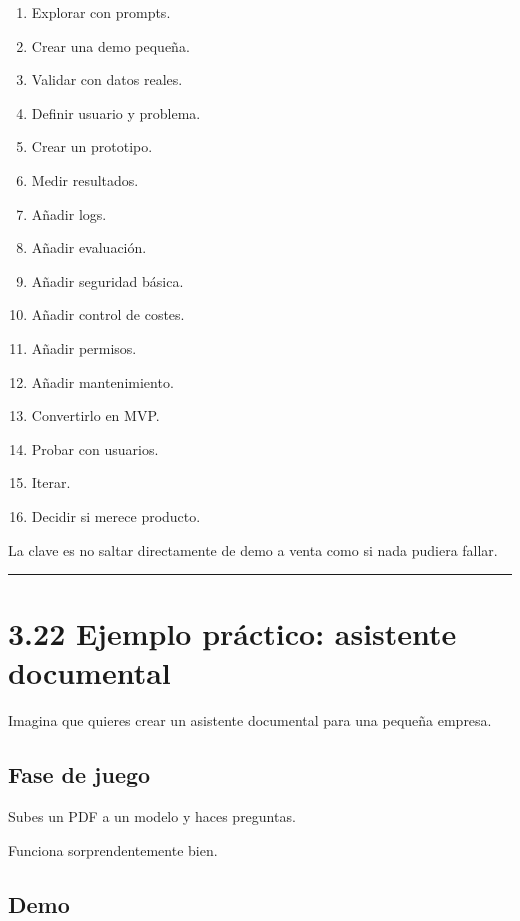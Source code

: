 \begin{enumerate}
\def\labelenumi{\arabic{enumi}.}
\tightlist
\item
  Explorar con prompts.
\item
  Crear una demo pequeña.
\item
  Validar con datos reales.
\item
  Definir usuario y problema.
\item
  Crear un prototipo.
\item
  Medir resultados.
\item
  Añadir logs.
\item
  Añadir evaluación.
\item
  Añadir seguridad básica.
\item
  Añadir control de costes.
\item
  Añadir permisos.
\item
  Añadir mantenimiento.
\item
  Convertirlo en MVP.
\item
  Probar con usuarios.
\item
  Iterar.
\item
  Decidir si merece producto.
\end{enumerate}

La clave es no saltar directamente de demo a venta como si nada pudiera
fallar.

\begin{center}\rule{0.5\linewidth}{0.5pt}\end{center}

\section{3.22 Ejemplo práctico: asistente
documental}\label{ejemplo-pruxe1ctico-asistente-documental}

Imagina que quieres crear un asistente documental para una pequeña
empresa.

\subsection{Fase de juego}\label{fase-de-juego}

Subes un PDF a un modelo y haces preguntas.

Funciona sorprendentemente bien.

\subsection{Demo}\label{demo}

